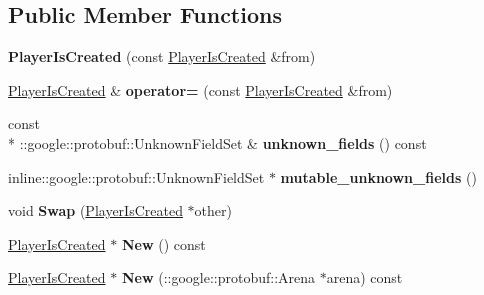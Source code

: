 \subsection*{Public Member Functions}
\begin{DoxyCompactItemize}
\item 
\hypertarget{class_player_is_created_ae905e532042d12b2c289b3affb8dd903}{{\bfseries Player\-Is\-Created} (const \hyperlink{class_player_is_created}{Player\-Is\-Created} \&from)}\label{class_player_is_created_ae905e532042d12b2c289b3affb8dd903}

\item 
\hypertarget{class_player_is_created_aef6d923f253b5eb33ac0623f73290e4e}{\hyperlink{class_player_is_created}{Player\-Is\-Created} \& {\bfseries operator=} (const \hyperlink{class_player_is_created}{Player\-Is\-Created} \&from)}\label{class_player_is_created_aef6d923f253b5eb33ac0623f73290e4e}

\item 
\hypertarget{class_player_is_created_afee68e43e7b6d43a14cbe716d304d506}{const \\*
\-::google\-::protobuf\-::\-Unknown\-Field\-Set \& {\bfseries unknown\-\_\-fields} () const }\label{class_player_is_created_afee68e43e7b6d43a14cbe716d304d506}

\item 
\hypertarget{class_player_is_created_a04590b849c6fb6b6f3fdde289e6c8d3c}{inline\-::google\-::protobuf\-::\-Unknown\-Field\-Set $\ast$ {\bfseries mutable\-\_\-unknown\-\_\-fields} ()}\label{class_player_is_created_a04590b849c6fb6b6f3fdde289e6c8d3c}

\item 
\hypertarget{class_player_is_created_a63a11c81586cf8e47746156ccae99730}{void {\bfseries Swap} (\hyperlink{class_player_is_created}{Player\-Is\-Created} $\ast$other)}\label{class_player_is_created_a63a11c81586cf8e47746156ccae99730}

\item 
\hypertarget{class_player_is_created_a52f0592fe68576e9cd73e2c892d514ac}{\hyperlink{class_player_is_created}{Player\-Is\-Created} $\ast$ {\bfseries New} () const }\label{class_player_is_created_a52f0592fe68576e9cd73e2c892d514ac}

\item 
\hypertarget{class_player_is_created_a224bc1932f4a20ea62cc4bd0107d270f}{\hyperlink{class_player_is_created}{Player\-Is\-Created} $\ast$ {\bfseries New} (\-::google\-::protobuf\-::\-Arena $\ast$arena) const }\label{class_player_is_created_a224bc1932f4a20ea62cc4bd0107d270f}


\end{DoxyCompactItemize}
